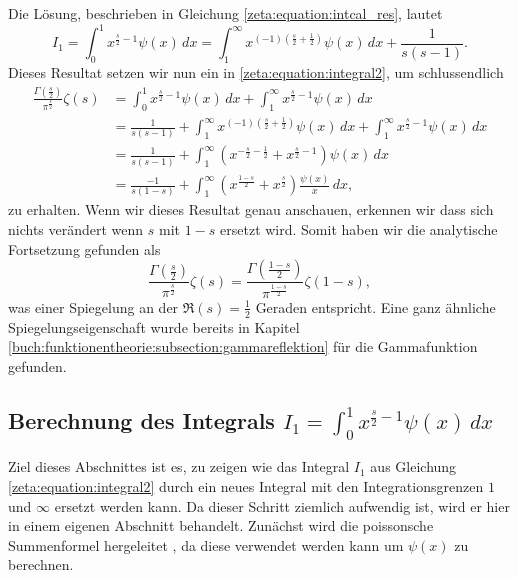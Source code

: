 Die Lösung, beschrieben in Gleichung \eqref{zeta:equation:intcal_res}, lautet
\begin{equation*}
    I_1
    =
    \int_0^{1}
    x^{\frac{s}{2}-1}
    \psi(x)
    \,dx
    =
    \int_{1}^{\infty}
    x^{(-1) \left(\frac{s}{2}+\frac{1}{2}\right)}
    \psi(x)
    \,dx
    +
    \frac{1}{s(s-1)}.
\end{equation*}
Dieses Resultat setzen wir nun ein in \eqref{zeta:equation:integral2}, um schlussendlich
\begin{align}
    \frac{\Gamma \left( \frac{s}{2} \right)}{\pi^{\frac{s}{2}}}
    \zeta(s)
    &=
    \int_0^{1}
    x^{\frac{s}{2}-1}
    \psi(x)
    \,dx
    +
    \int_1^{\infty}
    x^{\frac{s}{2}-1}
    \psi(x)
    \,dx
    \nonumber
    \\
    &=
    \frac{1}{s(s-1)}
    +
    \int_{1}^{\infty}
    x^{(-1) \left(\frac{s}{2}+\frac{1}{2}\right)}
    \psi(x)
    \,dx
    +
    \int_1^{\infty}
    x^{\frac{s}{2}-1}
    \psi(x)
    \,dx
    \\
    &=
    \frac{1}{s(s-1)}
    +
    \int_{1}^{\infty}
    \left(
    x^{-\frac{s}{2}-\frac{1}{2}}
    +
    x^{\frac{s}{2}-1}
    \right)
    \psi(x)
    \,dx
    \\
    &=
    \frac{-1}{s(1-s)}
    +
    \int_{1}^{\infty}
    \left(
    x^{\frac{1-s}{2}}
    +
    x^{\frac{s}{2}}
    \right)
    \frac{\psi(x)}{x}
    \,dx,
\end{align}
zu erhalten.
Wenn wir dieses Resultat genau anschauen, erkennen wir dass sich nichts verändert wenn $s$ mit $1-s$ ersetzt wird.
Somit haben wir die analytische Fortsetzung gefunden als
\begin{equation}\label{zeta:equation:functional}
    \frac{\Gamma \left( \frac{s}{2} \right)}{\pi^{\frac{s}{2}}}
    \zeta(s)
    =
    \frac{\Gamma \left( \frac{1-s}{2} \right)}{\pi^{\frac{1-s}{2}}}
    \zeta(1-s),
\end{equation}
was einer Spiegelung an der $\Re(s) = \frac{1}{2}$ Geraden entspricht.
Eine ganz ähnliche Spiegelungseigenschaft wurde bereits in Kapitel \ref{buch:funktionentheorie:subsection:gammareflektion} für die Gammafunktion gefunden.

\subsection{Berechnung des Integrals $I_1 = \int_0^{1} x^{\frac{s}{2}-1} \psi(x) \,dx$} \label{zeta:subsubsec:intcal}

Ziel dieses Abschnittes ist es, zu zeigen wie das Integral $I_1$ aus Gleichung \eqref{zeta:equation:integral2} durch ein neues Integral mit den Integrationsgrenzen $1$ und $\infty$ ersetzt werden kann.
Da dieser Schritt ziemlich aufwendig ist, wird er hier in einem eigenen Abschnitt behandelt.
Zunächst wird die poissonsche Summenformel hergeleitet \cite{zeta:online:poisson}, da diese verwendet werden kann um $\psi(x)$ zu berechnen.

